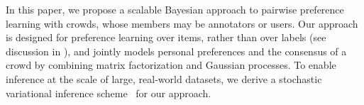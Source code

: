 In this paper, we propose a scalable Bayesian approach to pairwise preference learning with crowds,
whose members may be annotators or users. %
Our approach is designed for preference learning over items, rather than over labels (see discussion in \citet{furnkranz2010preference}),
and jointly models %
personal preferences and the consensus of a crowd by combining 
matrix factorization and Gaussian processes. %
To enable inference at the scale of large, real-world datasets,
we derive a stochastic variational inference scheme~\citep{hoffman2013stochastic} for our approach.
